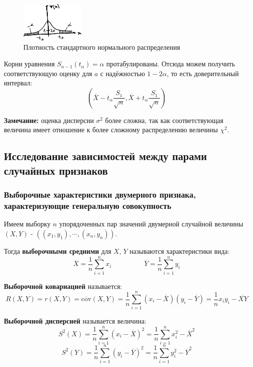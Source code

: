 \documentclass[12pt, a4paper]{article}
\newcommand{\cov}{\mathrm{cov}}
\begin{document}
\begin{figure}
  \centering
  \includegraphics[width=0.28\textwidth]{03}
  \vspace{-4mm}
  \caption{Плотность стандартного нормального распределения}
\end{figure}

Корни уравнения $S_{n-1}(t_{\alpha}) = \alpha$ протабулированы. Отсюда можем получить соответствующую оценку для $a$ с надёжностью $1-2\alpha$, то есть доверительный интервал:
\[(\overline{X} - t_{\alpha} \frac{S_1}{\sqrt{n}}, \overline{X} + t_{\alpha} \frac{S_1}{\sqrt{n}}) \]

\textbf{Замечание:} оценка дисперсии $\sigma^2$ более сложна, так как соответствующая величина имеет отношение к более сложному распределению величины $\chi^2$.

\subsection{Исследование зависимостей между парами случайных признаков}

\subsubsection{Выборочные характеристики двумерного признака, характеризующие генеральную совокупность}

Имеем выборку $n$ упорядоченных пар значений двумерной случайной величины $(X, Y)$ - $((x_1, y_1), \cdots, (x_n, y_n))$.

Тогда \textbf{выборочными средними} для $X$, $Y$ называются характеристики вида:
\[\overline{X} = \frac{1}{n} \sum_{i=1}^n x_i \hspace{2cm} \overline{Y} = \frac{1}{n} \sum_{i=1}^n y_i \]

\textbf{Выборочной ковариацией} называется: 
\[R(X, Y) = r(X, Y) = \overline{\cov} (X, Y) = \frac{1}{n} \sum_{i=1}^n (x_i - \overline{X})(y_i - \overline{Y}) = \frac{1}{n} x_iy_i - \overline{XY} \]

\textbf{Выборочной дисперсией} называется величина:
\[S^2(X) = \frac{1}{n} \sum_{i=1}^n (x_i - \overline{X})^2 = \frac{1}{n} \sum_{i=1}^n x_i^2 - \overline{X}^2 \]
\[S^2(Y) = \frac{1}{n} \sum_{i=1}^n (y_i - \overline{Y})^2 = \frac{1}{n} \sum_{i=1}^n y_i^2 - \overline{Y}^2 \]
\end{document}
